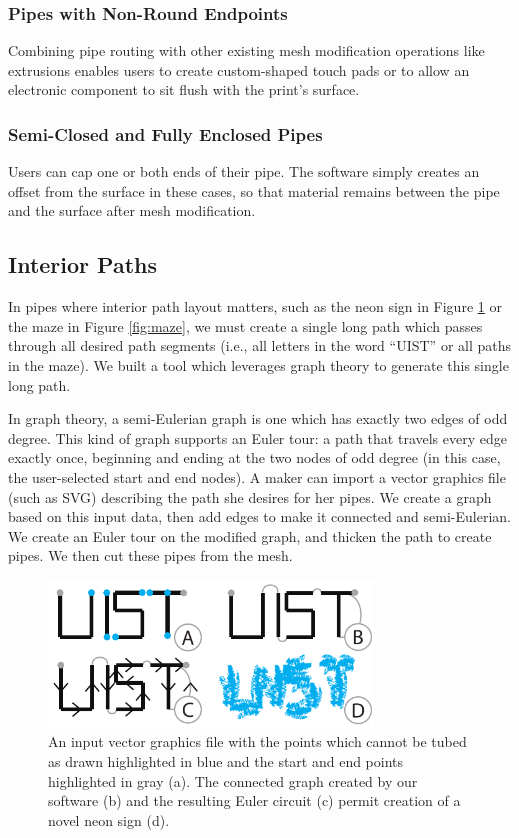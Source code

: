 \subsubsection{Pipes with Non-Round Endpoints}
Combining pipe routing with other existing mesh modification operations like extrusions enables users to create custom-shaped touch pads or to allow an electronic component to sit flush with the print's surface.

\subsubsection{Semi-Closed and Fully Enclosed Pipes}
Users can cap one or both ends of their pipe.  The software simply creates an offset from the surface in these cases, so that material remains between the pipe and the surface after mesh modification.

\subsection{Interior Paths}

In pipes where interior path layout matters, such as the neon sign in Figure \ref{fig:tool-process-interior} or the maze in Figure \ref{fig:maze}, we must create a single long path which passes through all desired path segments (i.e., all letters in the word ``UIST'' or all paths in the maze).  We built a tool which leverages graph theory to generate this single long path.

In graph theory, a semi-Eulerian graph is one which has exactly two edges of odd degree.  This kind of graph supports an Euler tour: a path that travels every edge exactly once, beginning and ending at the two nodes of odd degree (in this case, the user-selected start and end nodes).  A maker can import a vector graphics file (such as SVG) describing the path she desires for her pipes.  We create a graph based on this input data, then add edges to make it connected and semi-Eulerian.  We create an Euler tour on the modified graph, and thicken the path to create pipes.  We then cut these pipes from the mesh.

\begin{figure}[h!]
\centering
    \includegraphics[width=3.4in]{figures/interior.pdf}
\caption{An input vector graphics file with the points which cannot be tubed as drawn highlighted in {\color{blue}blue} and the start and end points highlighted in {\color{gray}gray} (a).  The connected graph created by our software (b) and the resulting Euler circuit (c) permit creation of a novel neon sign (d).}
\label{fig:tool-process-interior}
\end{figure}

